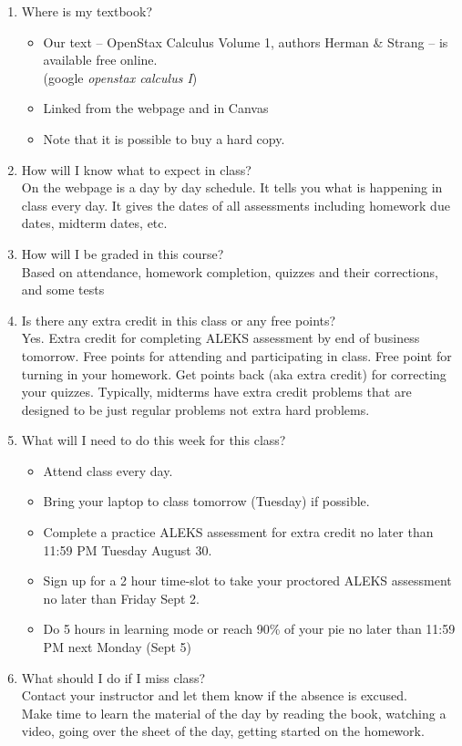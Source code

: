 \documentclass[11pt,fleqn]{article}
\begin{document}
\begin{enumerate}
\vfill
\item Where is my textbook?\\
\begin{itemize}
\item Our text -- OpenStax Calculus Volume 1, authors Herman \& Strang -- is available free online. \\
(google \emph{openstax calculus I})
\item Linked from the webpage and in Canvas
\item Note that it is possible to buy a hard copy. 
\end{itemize}
\vfill
\item How will I know what to expect in class?\\
On the webpage is a day by day schedule. It tells you what is happening in class every day. It gives the dates of all assessments including homework due dates, midterm dates, etc. 
\vfill
\item How will I be graded in this course? \\
Based on attendance, homework completion, quizzes and their corrections, and some tests
\vfill
\item Is there any extra credit in this class or any free points?\\
Yes. 
Extra credit for completing ALEKS assessment by end of business tomorrow.
Free points for attending and participating in class. Free point for turning in your homework. Get points back (aka extra credit) for correcting your quizzes.
Typically, midterms have extra credit problems that are designed to be just regular problems not extra hard problems.
\vfill
\item What will I need to do this week for this class?\\
\begin{itemize}
\item Attend class every day. 
\item Bring your laptop to class tomorrow (Tuesday) if possible.
\item Complete a practice ALEKS assessment for extra credit no later than 11:59 PM Tuesday August 30.
\item Sign up for a 2 hour time-slot to take your proctored ALEKS assessment no later than Friday Sept 2.
\item Do 5 hours in learning mode or reach 90\% of your pie no later than 11:59 PM next Monday (Sept 5)
\end{itemize}
\vfill

\item What should I do if I miss class?\\
Contact your instructor and let them know if the absence is excused.\\
Make time to learn the material of the day by reading the book, watching a video, going over the sheet of the day, getting started on the homework.
\vfill


\end{enumerate}
\end{document}
